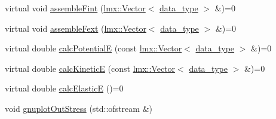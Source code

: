 \begin{DoxyCompactItemize}
virtual void \hyperlink{classmknix_1_1_gauss_point_a58d10c33e82aeff683bbf8278f2127c7}{assemble\+Fint} (\hyperlink{classlmx_1_1_vector}{lmx\+::\+Vector}$<$ \hyperlink{namespacemknix_a16be4b246fbf2cceb141e3a179111020}{data\+\_\+type} $>$ \&)=0
\item 
virtual void \hyperlink{classmknix_1_1_gauss_point_a313d373df3c5d10fcd13f4a691364b71}{assemble\+Fext} (\hyperlink{classlmx_1_1_vector}{lmx\+::\+Vector}$<$ \hyperlink{namespacemknix_a16be4b246fbf2cceb141e3a179111020}{data\+\_\+type} $>$ \&)=0
\item 
virtual double \hyperlink{classmknix_1_1_gauss_point_a32d6037b632fd18541cb07de6a9390f2}{calc\+Potential\+E} (const \hyperlink{classlmx_1_1_vector}{lmx\+::\+Vector}$<$ \hyperlink{namespacemknix_a16be4b246fbf2cceb141e3a179111020}{data\+\_\+type} $>$ \&)=0
\item 
virtual double \hyperlink{classmknix_1_1_gauss_point_af4560da98e996336e956969b0f70630c}{calc\+Kinetic\+E} (const \hyperlink{classlmx_1_1_vector}{lmx\+::\+Vector}$<$ \hyperlink{namespacemknix_a16be4b246fbf2cceb141e3a179111020}{data\+\_\+type} $>$ \&)=0
\item 
virtual double \hyperlink{classmknix_1_1_gauss_point_a7b463127f4c7ce3fd241bae8b0704c24}{calc\+Elastic\+E} ()=0
\item 
void \hyperlink{classmknix_1_1_gauss_point_a6d80a71224082e0ff5ab6c69d8a5bf58}{gnuplot\+Out\+Stress} (std\+::ofstream \&)
\end{DoxyCompactItemize}
